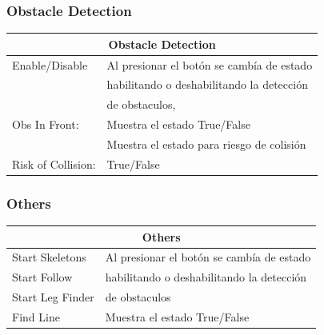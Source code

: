 \documentclass[user_manual.tex]{subfiles}
\begin{document}
\subsubsection{Obstacle Detection}

\begin{table}[H]
\begin{center}
\begin{tabular}{|l|l|}%

\hline
\multicolumn{2}{|c|}{Obstacle Detection}\\ \hline
Enable/Disable        & Al presionar el botón se cambía de estado  \\
                      & habilitando o deshabilitando la detección \\
                      & de obstaculos,  \\ \hline
Obs In Front:         & Muestra el estado True/False\\ \hline
                      & Muestra el estado para riesgo de colisión \\
Risk of Collision:    & True/False\\ \hline


\end{tabular}
\end{center}
\end{table}




\subsubsection{Others}

\begin{table}[H]
\begin{center}
\begin{tabular}{|l|l|}%

\hline
\multicolumn{2}{|c|}{Others}\\ \hline
Start Skeletons       & Al presionar el botón se cambía de estado  \\ \hline
Start Follow          & habilitando o deshabilitando la detección   \\ \hline
Start Leg Finder      & de obstaculos                                \\ \hline
Find Line             & Muestra el estado True/False                  \\ \hline

\end{tabular}
\end{center}
\end{table}
\end{document}
